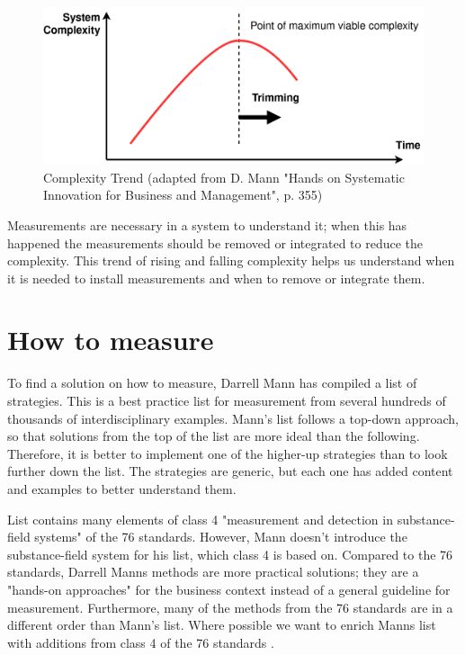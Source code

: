 \begin{figure}[h]
	\centering
	\includegraphics[width=\textwidth]{complexity2.png}
	\caption{Complexity Trend (adapted from D. Mann "Hands on Systematic Innovation for Business and Management", p. 355)}
\end{figure}

Measurements are necessary in a system to understand it; when this has happened the measurements should be removed or integrated to reduce the complexity.
This trend of rising and falling complexity helps us understand when it is needed to install measurements and when to remove or integrate them.


\section{How to measure}

To find a solution on how to measure, Darrell Mann has compiled a list of strategies.
This is a best practice list for measurement from several hundreds of thousands of interdisciplinary examples.
Mann's list follows a top-down approach, so that solutions from the top of the list are more ideal than the following.
Therefore, it is better to implement one of the higher-up strategies than to look further down the list.
The strategies are generic, but each one has added content and examples to better understand them.

List contains many elements of class 4 "measurement and detection in substance-field systems" of the 76 standards.
However, Mann doesn't introduce the substance-field system for his list, which class 4 is based on.
Compared to the 76 standards, Darrell Manns methods are more practical solutions; they are a "hands-on approaches" for the business context instead of a general guideline for measurement.
Furthermore, many of the methods from the 76 standards are in a different order than Mann's list.
Where possible we want to enrich Manns list with additions from class 4 of the 76 standards \cite{koltze}.


